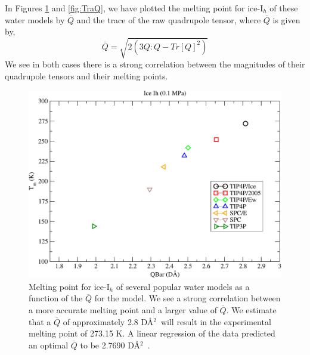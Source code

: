 In Figures \ref{fig:QBar} and \ref{fig:TraQ}, we have plotted the
melting point for ice-I$_h$ of these water models by $\overline{Q}$
and the trace of the raw quadrupole tensor, where $\overline{Q}$ is
given by,
\begin{equation}
\overline{Q} = \sqrt{2(3 Q:Q - Tr[Q]^{2})}
\end{equation}
We see in both cases there is a strong correlation between the magnitudes
of their quadrupole tensors and their melting points.


\begin{figure}
\includegraphics[width=\linewidth]{Figures/Tm_Ih_Qbar_plot.pdf}
\caption{\label{fig:QBar} Melting point for ice-I$_h$ of several
  popular water models as a function of the $\overline{Q}$ for the model. We see
  a strong correlation between a more accurate melting point and a
  larger value of $\overline{Q}$. We estimate that a $\overline{Q}$ of
  approximately 2.8 D\AA$^{2}$~will result in the experimental melting point
  of 273.15 K. A linear regression of the data predicted
  an optimal $\overline{Q}$ to be 2.7690 D\AA$^{2}$~.}
\end{figure}

